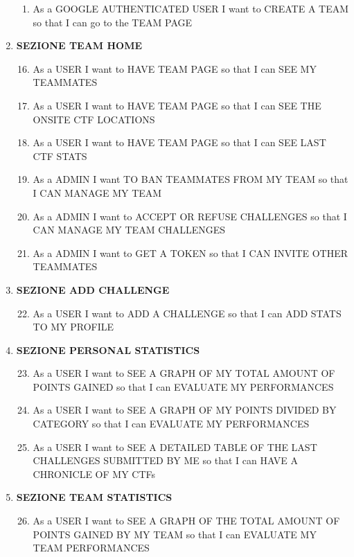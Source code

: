 \documentclass[a4paper,12pt]{extarticle}
\begin{document}
\begin{enumerate}[label=\Alph*)]
\begin{enumerate}[label=\textbf{\arabic*.}]
            \item As a GOOGLE AUTHENTICATED USER I want to CREATE A TEAM so that I can go to the TEAM PAGE
		\end{enumerate}
		\item \textbf{SEZIONE TEAM HOME}
		\begin{enumerate}[label=\textbf{\arabic*.}]
			\setcounter{enumii}{15}
			\item As a USER I want to HAVE TEAM PAGE so that I can SEE MY TEAMMATES 
			\item As a USER I want to HAVE TEAM PAGE so that I can SEE THE ONSITE CTF LOCATIONS
			\item As a USER I want to HAVE TEAM PAGE so that I can SEE LAST CTF STATS
			\item As a ADMIN I want TO BAN TEAMMATES FROM MY TEAM so that I CAN MANAGE MY TEAM
			\item As a ADMIN I want to ACCEPT OR REFUSE CHALLENGES so that I CAN MANAGE MY TEAM CHALLENGES
			\item As a ADMIN I want to GET A TOKEN so that I CAN INVITE OTHER TEAMMATES
		\end{enumerate}
		\item \textbf{SEZIONE ADD CHALLENGE}
		\begin{enumerate}[label=\textbf{\arabic*.}]
		\setcounter{enumii}{21}
		    \item As a USER I want to ADD A CHALLENGE so that I can ADD STATS TO MY PROFILE
		\end{enumerate}
		\item \textbf{SEZIONE PERSONAL STATISTICS}
		\begin{enumerate}[label=\textbf{\arabic*.}]
		\setcounter{enumii}{22}
		    \item As a USER I want to SEE A GRAPH OF MY TOTAL AMOUNT OF POINTS GAINED so that I can EVALUATE MY PERFORMANCES
		    \item As a USER I want to SEE A GRAPH OF MY POINTS DIVIDED BY CATEGORY so that I can EVALUATE MY PERFORMANCES
		    \item As a USER I want to SEE A DETAILED TABLE OF THE LAST CHALLENGES SUBMITTED BY ME so that I can HAVE A CHRONICLE OF MY CTFs
		\end{enumerate}
		\item \textbf{SEZIONE TEAM STATISTICS}
		\begin{enumerate}[label=\textbf{\arabic*.}]
		\setcounter{enumii}{25}
		    \item As a USER I want to SEE A GRAPH OF THE TOTAL AMOUNT OF POINTS GAINED BY MY TEAM so that I can EVALUATE MY TEAM PERFORMANCES

\end{enumerate}
\end{enumerate}
\end{document}
